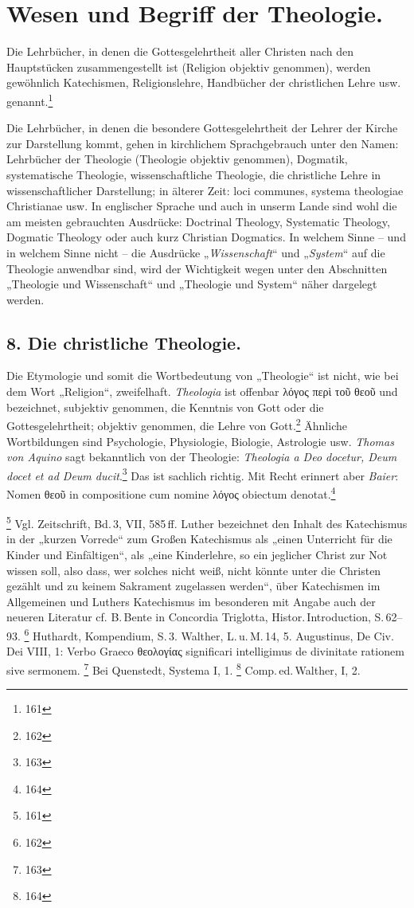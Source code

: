 \section*{Wesen und Begriff der Theologie.}

Die Lehrbücher, in denen die Gottesgelehrtheit aller Christen nach den Hauptstücken zusammengestellt ist (Religion objektiv genommen), werden gewöhnlich Katechismen, Religionslehre, Handbücher der christlichen Lehre usw. genannt.\footnote{161}

Die Lehrbücher, in denen die besondere Gottesgelehrtheit der Lehrer der Kirche zur Darstellung kommt, gehen in kirchlichem Sprachgebrauch unter den Namen: Lehrbücher der Theologie (Theologie objektiv genommen), Dogmatik, systematische Theologie, wissenschaftliche Theologie, die christliche Lehre in wissenschaftlicher Darstellung; in älterer Zeit: loci communes, systema theologiae Christianae usw. In englischer Sprache und auch in unserm Lande sind wohl die am meisten gebrauchten Ausdrücke: Doctrinal Theology, Systematic Theology, Dogmatic Theology oder auch kurz Christian Dogmatics. In welchem Sinne -- und in welchem Sinne nicht -- die Ausdrücke „\emph{Wissenschaft}“ und „\emph{System}“ auf die Theologie anwendbar sind, wird der Wichtigkeit wegen unter den Abschnitten „Theologie und Wissenschaft“ und „Theologie und System“ näher dargelegt werden.

\subsection*{8. Die christliche Theologie.}

Die Etymologie und somit die Wortbedeutung von „Theologie“ ist nicht, wie bei dem Wort „Religion“, zweifelhaft. \emph{Theologia} ist offenbar \foreignlanguage{greek}{λόγος περὶ τοῦ θεοῦ} und bezeichnet, subjektiv genommen, die Kenntnis von Gott oder die Gottesgelehrtheit; objektiv genommen, die Lehre von Gott.\footnote{162} Ähnliche Wortbildungen sind Psychologie, Physiologie, Biologie, Astrologie usw. \emph{Thomas von Aquino} sagt bekanntlich von der Theologie: \emph{Theologia a Deo docetur, Deum docet et ad Deum ducit}.\footnote{163} Das ist sachlich richtig. Mit Recht erinnert aber \emph{Baier}: Nomen \foreignlanguage{greek}{θεοῦ} in compositione cum nomine \foreignlanguage{greek}{λόγος} obiectum denotat.\footnote{164}

\footnote{161} Vgl. Zeitschrift, Bd.\,3, VII, 585\,ff. Luther bezeichnet den Inhalt des Katechismus in der „kurzen Vorrede“ zum Großen Katechismus als „einen Unterricht für die Kinder und Einfältigen“, als „eine Kinderlehre, so ein jeglicher Christ zur Not wissen soll, also dass, wer solches nicht weiß, nicht könnte unter die Christen gezählt und zu keinem Sakrament zugelassen werden“, über Katechismen im Allgemeinen und Luthers Katechismus im besonderen mit Angabe auch der neueren Literatur cf. B.\,Bente in Concordia Triglotta, Histor.\,Introduction, S.\,62--93.
\footnote{162} Huthardt, Kompendium, S.\,3. Walther, L.\,u.\,M.\,14, 5. Augustinus, De Civ.\,Dei VIII, 1: Verbo Graeco \foreignlanguage{greek}{θεολογίας} significari intelligimus de divinitate rationem sive sermonem.
\footnote{163} Bei Quenstedt, Systema I, 1.
\footnote{164} Comp.\,ed.\,Walther, I, 2.